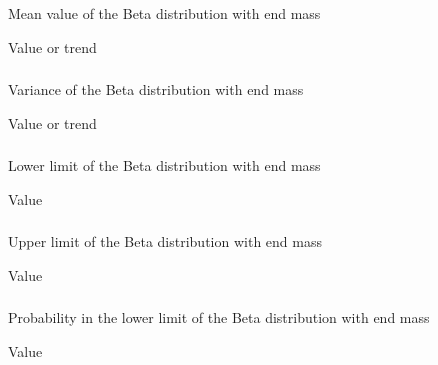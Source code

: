 {\subsubsection{}
 \slist
   \item \Description Mean value of the Beta distribution with end mass
   \item \Argument Value or trend
   \item \Default 
 \elist

\subsubsection{}
 \slist
   \item \Description Variance of the Beta distribution with end mass
   \item \Argument Value or trend
   \item \Default 
 \elist

\subsubsection{}
 \slist
   \item \Description Lower limit of the Beta distribution with end mass
   \item \Argument Value
   \item {}
 \elist

\subsubsection{}
 \slist
   \item \Description Upper limit of the Beta distribution with end mass
   \item \Argument Value
   \item {}
 \elist

\subsubsection{}
 \slist
   \item \Description Probability in the lower limit of the Beta distribution with end mass
   \item \Argument Value
   \item \Default
 \elist

}
